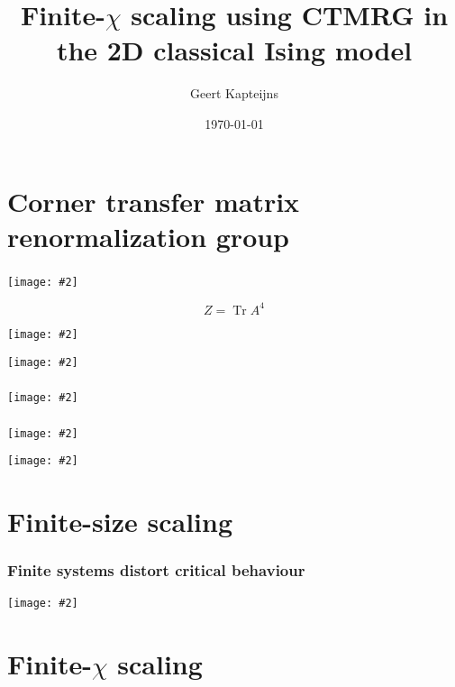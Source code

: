\documentclass{beamer}
\title{Finite-$\chi$ scaling using CTMRG in the 2D classical Ising model}
\date{\today}
\author{Geert Kapteijns}
\DeclareMathOperator{\tr}{Tr}
\newcommand{\includeproper}[2][0.8]{\texttt{[image: \#2]}}
\begin{document}
\maketitle

\section{Corner transfer matrix renormalization group}

\begin{frame}
  \frametitle{\cite{nishino1996corner}}
  \includeproper[0.6]{ctm_tensor_network.png}

  \begin{equation*}
    Z = \tr A^4
  \end{equation*}
\end{frame}

\begin{frame}
  \includeproper[]{ctm_renormalization_step.png}
\end{frame}

\begin{frame}
  \includeproper[]{ctm_reduced_density_matrix.png}
\end{frame}

\begin{frame}
  \frametitle{\cite{baxter1982exactly_ctm}}
  \includeproper[]{baxter_truncated_equations.png}
\end{frame}

\begin{frame}
  \frametitle{\cite{baxter1978variational, baxter1968dimers}}
  \includeproper[]{baxter_mps.png}
\end{frame}

\begin{frame}
  \includeproper[]{baxter_free_energy.png}
\end{frame}



\section{Finite-size scaling}

\begin{frame}
  \frametitle{Finite systems distort critical behaviour}
  \includeproper[]{order_parameter_vs_T_N8-24_exact.pdf}
\end{frame}

\section{Finite-$\chi$ scaling}
\end{document}
